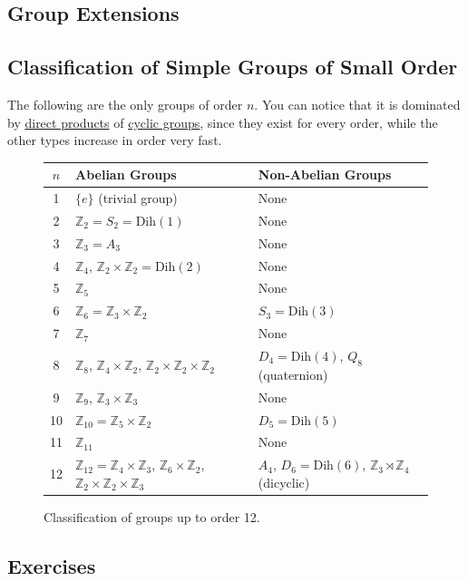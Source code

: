 \subsection{Group Extensions}

\subsection{Classification of Simple Groups of Small Order}

  \begin{theorem}
    \label{thm:classification-of-simple-groups-of-small-order}
    The following are the only groups of order $n$. You can notice that it is dominated by \hyperref[def:direct-product]{direct products} of \hyperref[def:cyclic-group]{cyclic groups}, since they exist for every order, while the other types increase in order very fast.   

    \begin{figure}[H]
      \centering
      \begin{tabular}{|c|l|l|}
      \hline
      $n$ & \textbf{Abelian Groups} & \textbf{Non-Abelian Groups} \\
      \hline
      1 & $\{e\}$ (trivial group) & None \\
      \hline
      2 & $\mathbb{Z}_2 = S_2 = \text{Dih}(1)$ & None \\
      \hline
      3 & $\mathbb{Z}_3 = A_3$ & None \\
      \hline
      4 & $\mathbb{Z}_4$, $\mathbb{Z}_2 \times \mathbb{Z}_2 = \text{Dih}(2)$ & None \\
      \hline
      5 & $\mathbb{Z}_5$ & None \\
      \hline
      6 & $\mathbb{Z}_6 = \mathbb{Z}_3 \times \mathbb{Z}_2$ & $S_3 = \text{Dih}(3)$ \\
      \hline
      7 & $\mathbb{Z}_7$ & None \\
      \hline
      8 & $\mathbb{Z}_8$, $\mathbb{Z}_4 \times \mathbb{Z}_2$, $\mathbb{Z}_2 \times \mathbb{Z}_2 \times \mathbb{Z}_2$ & $D_4 = \text{Dih}(4)$, $Q_8$ (quaternion) \\
      \hline
      9 & $\mathbb{Z}_9$, $\mathbb{Z}_3 \times \mathbb{Z}_3$ & None \\
      \hline
      10 & $\mathbb{Z}_{10} = \mathbb{Z}_5 \times \mathbb{Z}_2$ & $D_5 = \text{Dih}(5)$ \\
      \hline
      11 & $\mathbb{Z}_{11}$ & None \\
      \hline
      12 & $\mathbb{Z}_{12} = \mathbb{Z}_4 \times \mathbb{Z}_3$, $\mathbb{Z}_6 \times \mathbb{Z}_2$, $\mathbb{Z}_2 \times \mathbb{Z}_2 \times \mathbb{Z}_3$ & $A_4$, $D_6 = \text{Dih}(6)$, $\mathbb{Z}_3 \rtimes \mathbb{Z}_4$ (dicyclic) \\
      \hline
      \end{tabular}
      \caption{Classification of groups up to order 12.}
      \label{tab:groups_up_to_order_10}
    \end{figure}
  \end{theorem}

\subsection{Exercises}
